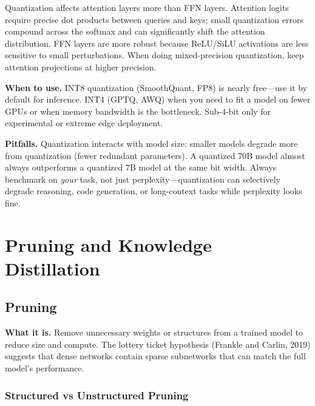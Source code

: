 \begin{warningbox}
Quantization affects attention layers more than FFN layers. Attention logits require precise dot products between queries and keys; small quantization errors compound across the softmax and can significantly shift the attention distribution. FFN layers are more robust because ReLU/SiLU activations are less sensitive to small perturbations. When doing mixed-precision quantization, keep attention projections at higher precision.
\end{warningbox}

\textbf{When to use.} INT8 quantization (SmoothQuant, FP8) is nearly free---use it by default for inference. INT4 (GPTQ, AWQ) when you need to fit a model on fewer GPUs or when memory bandwidth is the bottleneck. Sub-4-bit only for experimental or extreme edge deployment.

\textbf{Pitfalls.} Quantization interacts with model size: smaller models degrade more from quantization (fewer redundant parameters). A quantized 70B model almost always outperforms a quantized 7B model at the same bit width. Always benchmark on \textit{your} task, not just perplexity---quantization can selectively degrade reasoning, code generation, or long-context tasks while perplexity looks fine.

\section{Pruning and Knowledge Distillation}
\label{sec:pruning_distillation}

\subsection{Pruning}

\textbf{What it is.} Remove unnecessary weights or structures from a trained model to reduce size and compute. The lottery ticket hypothesis (Frankle and Carlin, 2019) suggests that dense networks contain sparse subnetworks that can match the full model's performance.

\subsubsection{Structured vs Unstructured Pruning}


